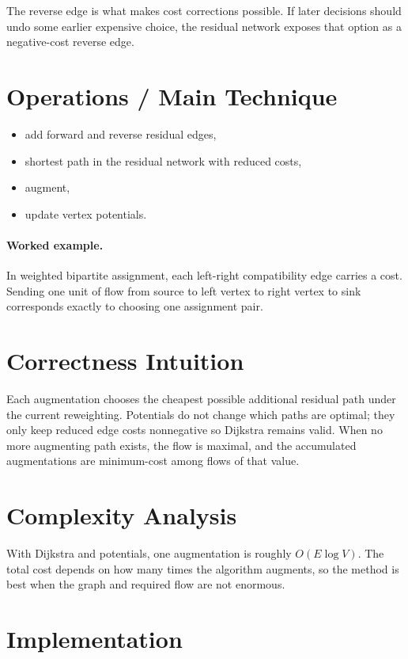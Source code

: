The reverse edge is what makes cost corrections possible. If later decisions should undo some earlier expensive choice,
the residual network exposes that option as a negative-cost reverse edge.

\section*{Operations / Main Technique}

\begin{itemize}
  \item add forward and reverse residual edges,
  \item shortest path in the residual network with reduced costs,
  \item augment,
  \item update vertex potentials.
\end{itemize}

\paragraph{Worked example.}
In weighted bipartite assignment, each left-right compatibility edge carries a cost. Sending one unit of flow from
source to left vertex to right vertex to sink corresponds exactly to choosing one assignment pair.

\section*{Correctness Intuition}

Each augmentation chooses the cheapest possible additional residual path under the current reweighting. Potentials do
not change which paths are optimal; they only keep reduced edge costs nonnegative so Dijkstra remains valid. When no
more augmenting path exists, the flow is maximal, and the accumulated augmentations are minimum-cost among flows of that
value.

\section*{Complexity Analysis}

With Dijkstra and potentials, one augmentation is roughly \(O(E \log V)\). The total cost depends on how many times the
algorithm augments, so the method is best when the graph and required flow are not enormous.

\section*{Implementation}


